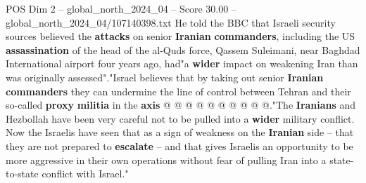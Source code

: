 \begin{textsample}{POS Dim 2 – global\_north\_2024\_04 – Score 30.00 – global\_north\_2024\_04/107140398.txt}
He told the BBC that Israeli security sources believed the \textbf{attacks} on senior \textbf{Iranian} \textbf{commanders}, including the US \textbf{assassination} of the head of the al-Quds force, Qassem Suleimani, near Baghdad International airport four years ago, had"a \textbf{wider} impact on weakening Iran than was originally assessed"."Israel believes that by taking out senior \textbf{Iranian} \textbf{commanders} they can undermine the line of control between Tehran and their so-called \textbf{proxy} \textbf{militia} in the \textbf{axis} @ @ @ @ @ @ @ @ @ @."The \textbf{Iranians} and Hezbollah have been very careful not to be pulled into a \textbf{wider} military conflict.
Now the Israelis have seen that as a sign of weakness on the \textbf{Iranian} side -- that they are not prepared to \textbf{escalate} -- and that gives Israelis an opportunity to be more aggressive in their own operations without fear of pulling Iran into a state-to-state conflict with Israel."

\end{textsample}
